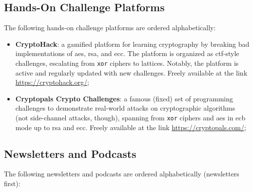 \subsection{Hands-On Challenge Platforms}\label{sec:appendix:further_resources:ctf}

The following hands-on challenge platforms are ordered alphabetically:

\begin{itemize}
	\item \textbf{CryptoHack}: a gamified platform for learning cryptography by breaking bad implementations of \gls{aes}, \gls{rsa}, and \gls{ecc}. The platform is organized as \gls{ctf}-style challenges, escalating from \texttt{xor} ciphers to lattices. Notably, the platform is active and regularly updated with new challenges. Freely available at the link \url{https://cryptohack.org/};
	
	\item \textbf{Cryptopals Crypto Challenges}: a famous (fixed) set of programming challenges to demonstrate real-world attacks on cryptographic algorithms (not side-channel attacks, though), spanning from \texttt{xor} ciphers and \gls{aes} in \gls{ecb} mode up to \gls{rsa} and \gls{ecc}. Freely available at the link \url{https://cryptopals.com/};
	
\end{itemize}



\subsection{Newsletters and Podcasts}\label{sec:appendix:further_resources:np} 

The following newsletters and podcasts are ordered alphabetically (newsletters first):

